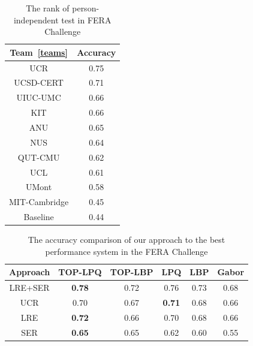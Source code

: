 \documentclass[journal]{IEEEtran}
\begin{document}
\begin{table}
\caption{The rank of person-independent test in FERA Challenge\label{table:fera_team}}
\centering
\begin{tabular}{|c|c|}
\hline
	Team~\ref{teams} & Accuracy \\ \hline
	UCR 								& 0.75 \\ 
	UCSD-CERT						& 0.71 \\ 
	UIUC-UMC						& 0.66 \\ 
	KIT									& 0.66 \\ 
	ANU									& 0.65 \\ 
	NUS									& 0.64 \\ 
	QUT-CMU							& 0.62 \\ 
	UCL									& 0.61 \\ 
	UMont								& 0.58 \\ 
	MIT-Cambridge				& 0.45 \\ 
	Baseline						& 0.44 \\
\hline
\end{tabular}
\end{table}

\begin{table}[htbp]
\caption{The accuracy comparison of our approach to the best performance system in the FERA Challenge\label{table:comp}}
\begin{center}
\begin{tabular}{|c|c|c|c|c|c|}
\hline
	Approach 									& TOP-LPQ	& TOP-LBP 	& LPQ 	& LBP 	& Gabor \\ \hline
	LRE+SER										& \textbf{0.78} 		& 0.72 	& 0.76 	&	0.73	& 0.68	\\
	UCR	\cite{Yang_SMCB12}		& 0.70 		& 0.67 	& \textbf{0.71} 	& 0.68	& 0.66	\\ 
	LRE												& \textbf{0.72} 		& 0.66 	& 0.70 	& 0.68	& 0.66	\\
	SER												& \textbf{0.65} 		& 0.65 	& 0.62 	& 0.60	& 0.55	\\
\hline
\end{tabular}
\end{center}
\end{table}
\end{document}
